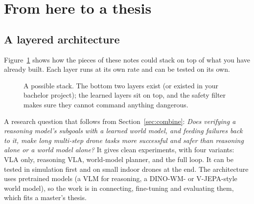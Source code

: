 \section{From here to a thesis}

\subsection{A layered architecture}
Figure~\ref{fig:stack} shows how the pieces of these notes could stack on top of what you have already built. Each layer runs at its own rate and can be tested on its own.

\begin{figure}[h]
\centering
{}
\caption{A possible stack. The bottom two layers exist (or existed in your bachelor project); the learned layers sit on top, and the safety filter makes sure they cannot command anything dangerous.}
\label{fig:stack}
\end{figure}

\begin{opinionbox}
A research question that follows from Section~\ref{sec:combine}: \emph{Does verifying a reasoning model's subgoals with a learned world model, and feeding failures back to it, make long multi-step drone tasks more successful and safer than reasoning alone or a world model alone?} It gives clean experiments, with four variants: VLA only, reasoning VLA, world-model planner, and the full loop. It can be tested in simulation first and on small indoor drones at the end. The architecture uses pretrained models (a VLM for reasoning, a DINO-WM- or V-JEPA-style world model), so the work is in connecting, fine-tuning and evaluating them, which fits a master's thesis.
\end{opinionbox}

